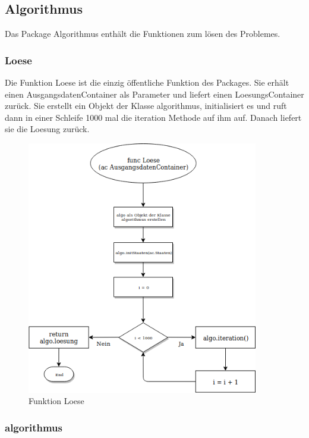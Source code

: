\pagebreak

\subsection{Algorithmus}

Das Package Algorithmus enthält die Funktionen zum lösen des Problemes.

\subsubsection{Loese}

Die Funktion Loese ist die einzig öffentliche Funktion des Packages.
Sie erhält einen AusgangsdatenContainer als Parameter und liefert einen LoesungsContainer zurück.
Sie erstellt ein Objekt der Klasse algorithmus, initialisiert es und ruft dann in einer Schleife 1000 mal die iteration Methode auf ihm auf.
Danach liefert sie die Loesung zurück.

\begin{figure}[h!]
    \centering
    \includegraphics[width=0.9\textwidth,]{Loese.png}
    \caption[]{Funktion Loese}
\end{figure}

\FloatBarrier

\subsubsection{algorithmus}

